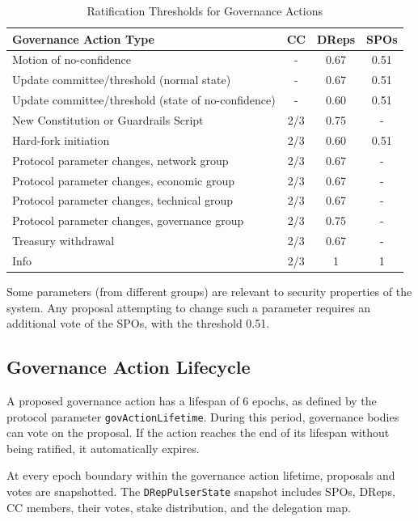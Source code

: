\begin{table}[ht]
\centering
\small
\begin{tabular}{|l|c|c|c|}
\hline
\textbf{Governance Action Type} & \textbf{CC} & \textbf{DReps} & \textbf{SPOs} \\ \hline
Motion of no-confidence & - & 0.67 & 0.51 \\ \hline
Update committee/threshold (normal state) & - & 0.67 & 0.51 \\ \hline
Update committee/threshold (state of no-confidence) & - & 0.60 & 0.51 \\ \hline
New Constitution or Guardrails Script & 2/3 & 0.75 & - \\ \hline
Hard-fork initiation & 2/3 & 0.60 & 0.51 \\ \hline
Protocol parameter changes, network group & 2/3 & 0.67 & - \\ \hline
Protocol parameter changes, economic group & 2/3 & 0.67 & - \\ \hline
Protocol parameter changes, technical group & 2/3 & 0.67 & - \\ \hline
Protocol parameter changes, governance group & 2/3 & 0.75 & - \\ \hline
Treasury withdrawal & 2/3 & 0.67 & - \\ \hline
Info & 2/3 & 1 & 1 \\ \hline
\end{tabular}
\caption{Ratification Thresholds for Governance Actions}
\end{table}

Some parameters (from different groups) are relevant to security properties of the system. Any proposal attempting to change such a parameter requires an additional vote of the SPOs, with the threshold 0.51.

\subsection{Governance Action Lifecycle}

A proposed governance action has a lifespan of 6 epochs, as defined by the protocol parameter \texttt{govActionLifetime}. During this period, governance bodies can vote on the proposal. If the action reaches the end of its lifespan without being ratified, it automatically expires.

At every epoch boundary within the governance action lifetime, proposals and votes are snapshotted. The \texttt{DRepPulserState} snapshot includes SPOs, DReps, CC members, their votes, stake distribution, and the delegation map.


